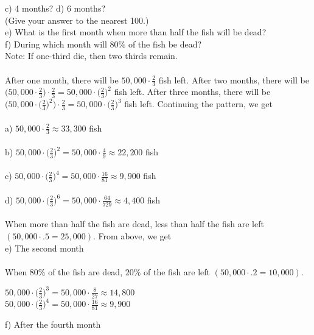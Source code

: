\documentclass[12pt]{article}
\begin{document}
c) 4 months? \hspace{3.4cm} d) 6 months? \\
(Give your answer to the nearest 100.) \\
e) What is the first month when more than half the fish will be dead? \\
f) During which month will $80\%$ of the fish be dead? \\
Note: If one-third die, then two thirds remain. \\
\\
After one month, there will be $50,000\cdot \displaystyle \frac{2}{3}$ fish left. After two months, there will be $\bigg(50,000\cdot \displaystyle \frac{2}{3}\bigg)\cdot \displaystyle \frac{2}{3}=50,000\cdot \bigg(\displaystyle \frac{2}{3}\bigg)^2$ fish left. After three months, there will be $\bigg(50,000\cdot \bigg(\displaystyle \frac{2}{3}\bigg)^2\bigg)\cdot \displaystyle \frac{2}{3}=50,000\cdot \bigg(\displaystyle \frac{2}{3}\bigg)^3$ fish left. Continuing the pattern, we get \\
\\
a) $50,000\cdot \displaystyle \frac{2}{3}\approx33,300$ fish \\
\\
b) $50,000\cdot \bigg(\displaystyle \frac{2}{3}\bigg)^2=50,000\cdot \displaystyle \frac{4}{9}\approx22,200$ fish \\
\\
c) $50,000\cdot \bigg(\displaystyle \frac{2}{3}\bigg)^4=50,000\cdot \displaystyle \frac{16}{81}\approx9,900$ fish \\
\\
d) $50,000\cdot \bigg(\displaystyle \frac{2}{3}\bigg)^6=50,000\cdot \displaystyle \frac{64}{729}\approx4,400$ fish \\
\\
When more than half the fish are dead, less than half the fish are left $(50,000\cdot.5=25,000)$. From above, we get \\
e) The second month \\
\\
When $80\%$ of the fish are dead, $20\%$ of the fish are left $(50,000\cdot.2=10,000)$.
\begin{center}
$50,000\cdot \bigg(\displaystyle \frac{2}{3}\bigg)^3=50,000\cdot \displaystyle \frac{8}{27}\approx14,800$ \\
$50,000\cdot \bigg(\displaystyle \frac{2}{3}\bigg)^4=50,000\cdot \displaystyle \frac{16}{81}\approx9,900$
\end{center}
f) After the fourth month \\
\end{document}
